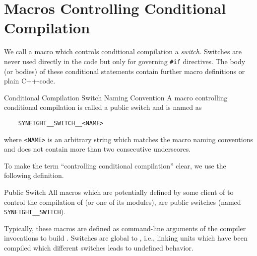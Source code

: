 %

%



\section{Macros Controlling Conditional Compilation}
\label{sec:macr-contr-cond}

We call a macro which controls conditional compilation a
\emph{switch.} Switches are never used directly in the code but only
for governing {\tt \#if} directives. The body (or bodies) of these
conditional statements contain further macro definitions or plain
C++-code.
%
\begin{rule*}{Conditional Compilation Switch Naming Convention}
  A macro controlling conditional compilation is called a public
  switch and is named as
  \begin{verbatim}
    SYNEIGHT__SWITCH__<NAME>
  \end{verbatim}
  where {\tt <NAME>} is an arbitrary string which matches the macro
  naming conventions and does not contain more than two consecutive
  underscores.
\end{rule*}
%
To make the term ``controlling conditional compilation'' clear, we use
the following definition.
%
\begin{definition*}{Public Switch}
  \label{def:public-switch}
  All macros which are potentially defined by some client of \SYNEIGHT
  to control the compilation of \SYNEIGHT (or one of its modules), are
  public switches (named {\tt SYNEIGHT\_\_SWITCH}).\\
\end{definition*}
%
Typically, these macros are defined as command-line arguments of the
compiler invocations to build \SYNEIGHT. Switches are global to
\SYNEIGHT, i.e., linking units which have been compiled which different
switches leads to undefined behavior.

